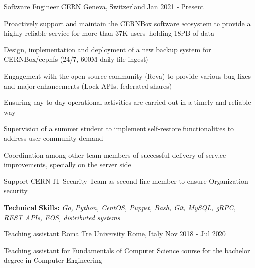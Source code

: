 

\begin{cventries}

  \cventry
    {Software Engineer} %
    {CERN} %
    {Geneva, Switzerland} %
    {Jan 2021 - Present} %
    {
      \begin{cvitems} %
        \item {Proactively support and maintain the CERNBox software ecosystem to provide a highly reliable service for more than 37K users, holding 18PB of data}
        \item {Design, implementation and deployment of a new backup system for CERNBox/cephfs (24/7, 600M daily file ingest)}
        \item {Engagement with the open source community (Reva) to provide various bug-fixes and major enhancements (Lock APIs, federated shares)}
        \item {Ensuring day-to-day operational activities are carried out in a timely and reliable way}
        \item {Supervision of a summer student to implement self-restore functionalities to address user community demand}
        \item {Coordination among other team members of successful delivery of service improvements, specially on the server side}
        \item {Support CERN IT Security Team as second line member to ensure Organization security}
        \item {\textbf{Technical Skills:} \textit{Go, Python, CentOS, Puppet, Bash, Git, MySQL, gRPC, REST APIs, EOS, distributed systems}}
      \end{cvitems}
    }
    \cventry
    {Teaching assistant} %
    {Roma Tre University} %
    {Rome, Italy} %
    {Nov 2018 - Jul 2020} %
    {
      \begin{cvitems} %
        \item {Teaching assistant for Fundamentals of Computer Science course for the bachelor degree in Computer Engineering}

\end{cvitems}}
\end{cventries}
